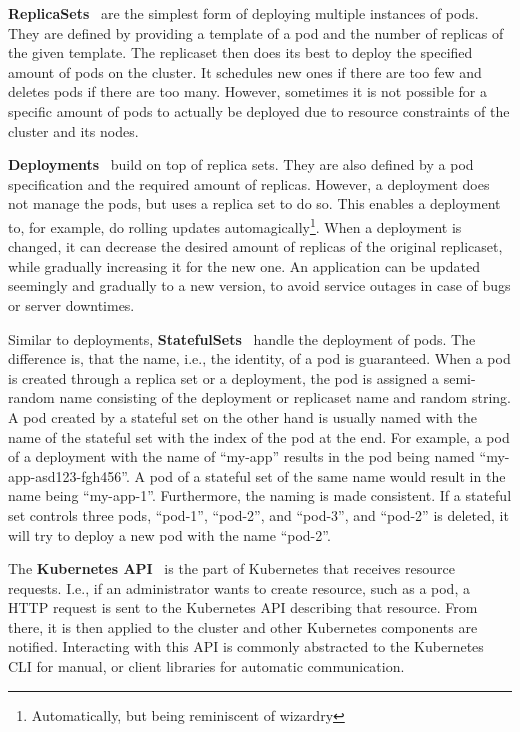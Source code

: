 \textbf{ReplicaSets}~\cite{kubernetes-replicaset} are the simplest form of deploying multiple instances of pods.
They are defined by providing a template of a pod and the number of replicas of the given template.
The replicaset then does its best to deploy the specified amount of pods on the cluster.
It schedules new ones if there are too few and deletes pods if there are too many.
However, sometimes it is not possible for a specific amount of pods to actually be deployed due to resource constraints of the cluster and its nodes.

\textbf{Deployments}~\cite{kubernetes-deployments} build on top of replica sets.
They are also defined by a pod specification and the required amount of replicas.
However, a deployment does not manage the pods, but uses a replica set to do so.
This enables a deployment to, for example, do rolling updates automagically\footnote{Automatically, but being reminiscent of wizardry}.
When a deployment is changed, it can decrease the desired amount of replicas of the original replicaset, while gradually increasing it for the new one.
An application can be updated seemingly and gradually to a new version, to avoid service outages in case of bugs or server downtimes.

Similar to deployments, \textbf{StatefulSets}~\cite{kubernetes-statefulsets} handle the deployment of pods.
The difference is, that the name, i.e., the identity, of a pod is guaranteed.
When a pod is created through a replica set or a deployment, the pod is assigned a semi-random name consisting of the deployment or replicaset name and random string.
A pod created by a stateful set on the other hand is usually named with the name of the stateful set with the index of the pod at the end.
For example, a pod of a deployment with the name of ``my-app'' results in the pod being named ``my-app-asd123-fgh456''.
A pod of a stateful set of the same name would result in the name being ``my-app-1''.
Furthermore, the naming is made consistent.
If a stateful set controls three pods, ``pod-1'', ``pod-2'', and ``pod-3'', and ``pod-2'' is deleted, it will try to deploy a new pod with the name ``pod-2''.

The \textbf{Kubernetes API}~\cite{kubernetes-api} is the part of Kubernetes that receives resource requests.
I.e., if an administrator wants to create resource, such as a pod, a HTTP request is sent to the Kubernetes API describing that resource.
From there, it is then applied to the cluster and other Kubernetes components are notified.
Interacting with this API is commonly abstracted to the Kubernetes CLI for manual, or client libraries for automatic communication.

